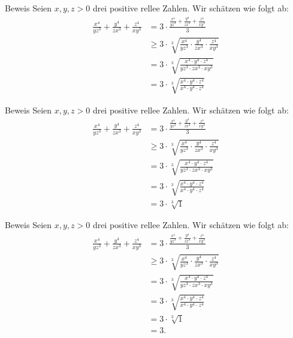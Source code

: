 \documentclass[10pt]{beamer}
\begin{document}
\begin{frame}{Beweis}
    Seien \( x, y, z > 0 \) drei positive rellee Zahlen. Wir schätzen wie folgt ab:
    \begin{align*}
        \frac{x^{4}}{y z^{3}} + \frac{y^{4}}{z x^{3}} + \frac{z^{4}}{x y^{3}}
        & = 3 \cdot \frac{\frac{x^{4}}{y z^{3}} + \frac{y^{4}}{z x^{3}} + \frac{z^{4}}{x y^{3}}}{3} \\
        & \geq 3 \cdot \sqrt[3]{\frac{x^{4}}{y z^{3}} \cdot \frac{y^{4}}{z x^{3}} \cdot \frac{z^{4}}{x y^{3}}} \\
        & = 3 \cdot \sqrt[3]{\frac{x^{4} \cdot y^{4} \cdot z^{4}}{y z^{3} \cdot z x^{3} \cdot x y^{3}}} \\
        & = 3 \cdot \sqrt[3]{\frac{x^{4} \cdot y^{4} \cdot z^{4}}{x^{4} \cdot y^{4} \cdot z^{4}}}
    \end{align*}
\end{frame}



\begin{frame}{Beweis}
    Seien \( x, y, z > 0 \) drei positive rellee Zahlen. Wir schätzen wie folgt ab:
    \begin{align*}
        \frac{x^{4}}{y z^{3}} + \frac{y^{4}}{z x^{3}} + \frac{z^{4}}{x y^{3}}
        & = 3 \cdot \frac{\frac{x^{4}}{y z^{3}} + \frac{y^{4}}{z x^{3}} + \frac{z^{4}}{x y^{3}}}{3} \\
        & \geq 3 \cdot \sqrt[3]{\frac{x^{4}}{y z^{3}} \cdot \frac{y^{4}}{z x^{3}} \cdot \frac{z^{4}}{x y^{3}}} \\
        & = 3 \cdot \sqrt[3]{\frac{x^{4} \cdot y^{4} \cdot z^{4}}{y z^{3} \cdot z x^{3} \cdot x y^{3}}} \\
        & = 3 \cdot \sqrt[3]{\frac{x^{4} \cdot y^{4} \cdot z^{4}}{x^{4} \cdot y^{4} \cdot z^{4}}} \\
        & = 3 \cdot \sqrt[3]{1}
    \end{align*}
\end{frame}



\begin{frame}{Beweis}
    Seien \( x, y, z > 0 \) drei positive rellee Zahlen. Wir schätzen wie folgt ab:
    \begin{align*}
        \frac{x^{4}}{y z^{3}} + \frac{y^{4}}{z x^{3}} + \frac{z^{4}}{x y^{3}}
        & = 3 \cdot \frac{\frac{x^{4}}{y z^{3}} + \frac{y^{4}}{z x^{3}} + \frac{z^{4}}{x y^{3}}}{3} \\
        & \geq 3 \cdot \sqrt[3]{\frac{x^{4}}{y z^{3}} \cdot \frac{y^{4}}{z x^{3}} \cdot \frac{z^{4}}{x y^{3}}} \\
        & = 3 \cdot \sqrt[3]{\frac{x^{4} \cdot y^{4} \cdot z^{4}}{y z^{3} \cdot z x^{3} \cdot x y^{3}}} \\
        & = 3 \cdot \sqrt[3]{\frac{x^{4} \cdot y^{4} \cdot z^{4}}{x^{4} \cdot y^{4} \cdot z^{4}}} \\
        & = 3 \cdot \sqrt[3]{1} \\
        & = 3.
    \end{align*}
\end{frame}
\end{document}
